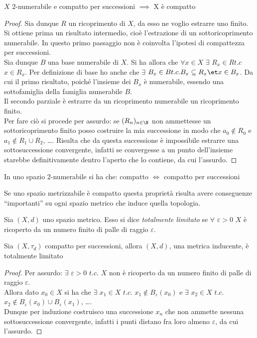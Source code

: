 \begin{prop}
$X$ $2$-numerabile e compatto per successioni $\implies$ X è compatto
\end{prop}
\begin{proof}
Sia dunque $R$ un ricoprimento di $X$, da esso ne voglio estrarre uno finito.\\
Si ottiene prima un risultato intermedio, cioè l'estrazione di un sottoricoprimento numerabile. In questo primo passaggio non è coinvolta l'ipotesi di compattezza per successioni.\\
Sia dunque $B$ una base numerabile di $X$. Si ha allora che $\forall x\in X$ $\exists$ $R_x \in R t.c$ $x\in R_x$. Per definizione di base ho anche che $\exists$ $B_x \in B t.c. B_x \subseteq R_x \et x\in B_x$. Da cui il primo risultato, poiché l'insieme dei $B_x$ è numerabile, essendo una sottofamiglia della famiglia numerabile $B$.\\
Il secondo parziale è estrarre da un ricoprimento numerabile un ricoprimento finito.\\
Per fare ciò si procede per assurdo: se $(R_n)_{n\in \N}$ non ammettesse un sottoricoprimento finito posso costruire la mia successione in modo che $a_0 \not \in R_0$ e $a_1 \not \in R_1 \cup R_2$, \dots . Risulta che da questa successione è impossibile estrarre una sottosuccessione convergente, infatti se convergesse a un punto dell'insieme starebbe definitivamente dentro l'aperto che lo contiene, da cui l'assurdo.
\end{proof}

\begin{cor}
In uno spazio $2$-numerabile si ha che: compatto $\iff$ compatto per successioni
\end{cor}

Se uno spazio metrizzabile è compatto questa proprietà risulta avere conseguenze ``importanti'' su ogni spazio metrico che induce quella topologia.

\begin{defn}
Sia $(X,d)$ uno spazio metrico. Esso si dice \emph{totalmente limitato} se $\forall$ $\varepsilon > 0$ $X$ è ricoperto da un numero finito di palle di raggio $\varepsilon$.
\end{defn}

\begin{prop}
Sia $(X,\tau _d)$ compatto per successioni, allora $(X,d)$, una metrica inducente, è totalmente limitato
\end{prop}
\begin{proof}
Per assurdo: $\exists$ $\varepsilon > 0$ $t.c.$ $X$ non è ricoperto da un numero finito di palle di raggio $\varepsilon$.\\
Allora dato $x_0 \in X$ si ha che $\exists$ $x_1 \in X$ $t.c.$ $x_1 \not \in B_\varepsilon (x_0)$ e $\exists$ $x_2 \in X$ $t.c.$ $x_2 \not \in B_\varepsilon (x_0) \cup B_\varepsilon (x_1)$, \dots .\\
Dunque per induzione costruisco una successione $x_n$ che non ammette nessuna sottosuccessione convergente, infatti i punti distano fra loro almeno $\varepsilon$, da cui l'assurdo.
\end{proof}

